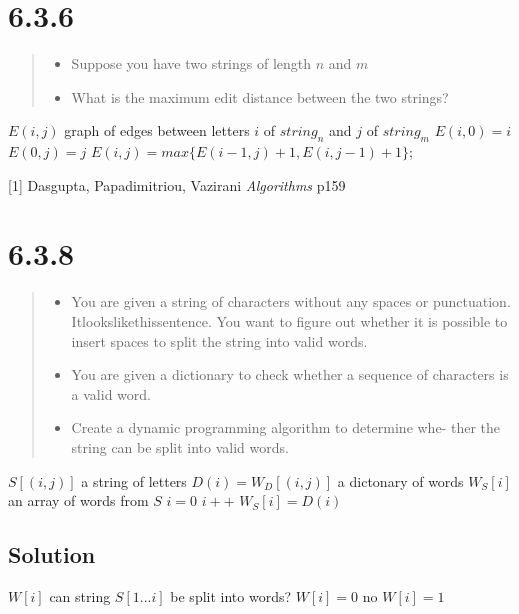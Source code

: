 \documentclass[12pt, letterpaper, twoside]{article}
\begin{document}
\section*{6.3.6}
\begin{quote}
  \begin{itemize}
    \item Suppose you have two strings of length $n$ and $m$
    \item What is the maximum edit distance between the two strings?
  \end{itemize}
\end{quote}
\begin{algorithmic}
  \State $E(i,j)$ graph of edges between letters $i$ of $string_n$ and $j$ of $string_m$
  \State $E(i,0)=i$
  \EndFor
  \State $E(0,j)=j$
  \EndFor
  \State $E(i,j)=max\{E(i-1,j)+1,E(i,j-1)+1\}$;
  \EndFor
  \EndFor
\end{algorithmic}
[1] Dasgupta, Papadimitriou, Vazirani \emph{Algorithms} p159
\newpage
\section*{6.3.8}
\begin{quote}
  \begin{itemize}
    \item You are given a string of characters without any spaces or punctuation. Itlookslikethissentence. You want to figure out whether it is possible to insert spaces to split the string into valid words.
    \item You are given a dictionary to check whether a sequence of characters is a valid word.
    \item Create a dynamic programming algorithm to determine whe- 
    ther the string can be split into valid words.
  \end{itemize}
\end{quote}
\begin{algorithmic}
  \State $S[(i,j)]$ a string of letters
  \State $D(i)=W_D[(i,j)]$ a dictonary of words
  \State $W_S[i]$ an array of words from $S$
  \State $i=0$
  \State $i++$
  \EndWhile
  \State $W_S[i]=D(i)$
  \EndIf
  \EndFor
\end{algorithmic}
\subsection*{Solution}
\begin{algorithmic}
  \State $W[i]$ can string $S[1...i]$ be split into words?
  \State $W[i]=0$ no
  \State $W[i]=1$
  \EndIf
  \EndFor
  \EndFor
\end{algorithmic}
\newpage
\end{document}
